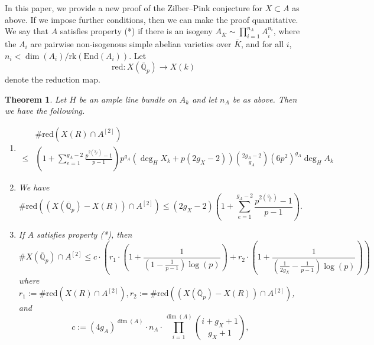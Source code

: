 \documentclass[11pt]{amsart}
\def\Q{\mathbb Q}
\newcommand{\tors}{\mathrm{tors}}
\newcommand{\rk}{\mathrm{rk}}
\newcommand{\End}{\mathrm{End}}
\theoremstyle{plain}
\newtheorem{theorem}{Theorem}
\theoremstyle{definition}
\newcommand{\red}{\mathrm{red}}
\begin{document}
In this paper, we provide a new proof of the Zilber--Pink conjecture for $X\subset A$ as above. 
If we impose further conditions, then we can make the proof quantitative. We say that $A$ satisfies property (*) if there is an isogeny $A_{\overline{K}}\sim \prod _{i=1}^{n_A} A_i ^{n_i }$, where the $A_i$ are pairwise non-isogenous simple abelian varieties over $\overline{K}$, and for all $i$, $n_i <\dim (A_i )/\rk (\End (A_i ))$. Let 
\[
\red :X(\overline{\Q }_p )\to X(k)
\]
denote the reduction map.

\begin{theorem}\label{theorem:main}
Let $H$ be an ample line bundle on $A_k$ and let $n_A$ be as above. 
Then we have the following.
\begin{enumerate}
\item 
\begin{align*}
& \# \red (X(R)\cap A^{[2]}) \\
\leq & \left(1+\sum _{e=1}^{g_A-2}\frac{p^{2\binom{g_A}{e}}-1}{p-1}\right)p^{g_A} (\deg _H X_k +p(2g_X -2)) \binom{2g_A -2}{g_A }(6p^2 )^{g_A }\deg _H A_k
\end{align*}
\item We have 
\[
\# \red ((X(\overline{\Q }_p )-X(R))\cap A^{[2]}) \leq (2g_X -2)\left(1+\sum _{e=1}^{g_A -2}\frac{p^{2\binom{g_A }{e}}-1}{p-1}\right).
\]
\item If $A$ satisfies property (*), then
\[
\# X(\overline{\Q }_p )\cap A^{[2]}\leq c\cdot \left( r_1 \cdot \left( 1+\frac{1}{(1 -\frac{1}{p-1})\log (p)}\right)+r_2 \cdot \left( 1+\frac{1}{(\frac{1}{2g_X} -\frac{1}{p-1})\log (p)}\right) \right) 
\]
where $r_1 := \# \red (X(R)\cap A^{[2]}), r_2 := \# \red ((X(\overline{\Q }_p )-X(R))\cap A^{[2]}) $, and 
\[
c:=(4g_A )^{\dim (A)}\cdot n_A \cdot  \prod _{i=1}^{\dim (A)} \binom{i+g_X +1}{g_X +1},
\]
\end{enumerate}
\end{theorem}
\end{document}
